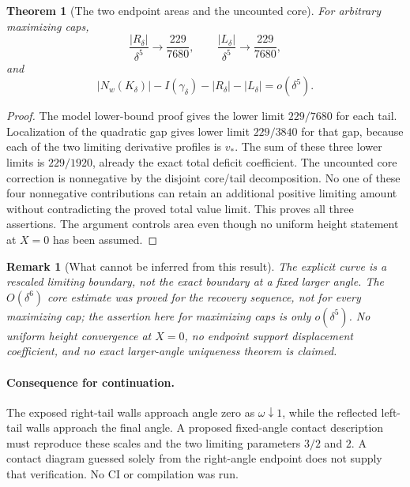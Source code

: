 \documentclass[11pt]{article}
\newtheorem{theorem}{Theorem}
\newtheorem{remark}{Remark}
\begin{document}
\begin{theorem}[The two endpoint areas and the uncounted core]
For arbitrary maximizing caps,
\[
 \frac{|R_\delta|}{\delta^5}\longrightarrow\frac{229}{7680},\qquad
 \frac{|L_\delta|}{\delta^5}\longrightarrow\frac{229}{7680},
\]
and
\[
 |N_w(K_\delta)|-I(\gamma_\delta)-|R_\delta|-|L_\delta|=o(\delta^5).
\]
\end{theorem}
\begin{proof}
The model lower-bound proof gives the lower limit $229/7680$ for each tail. Localization of the quadratic gap gives lower limit $229/3840$ for that gap, because each of the two limiting derivative profiles is $v_*$. The sum of these three lower limits is $229/1920$, already the exact total deficit coefficient. The uncounted core correction is nonnegative by the disjoint core/tail decomposition. No one of these four nonnegative contributions can retain an additional positive limiting amount without contradicting the proved total value limit. This proves all three assertions. The argument controls area even though no uniform height statement at $X=0$ has been assumed.
\end{proof}

\begin{remark}[What cannot be inferred from this result]
The explicit curve is a rescaled limiting boundary, not the exact boundary at a fixed larger angle. The $O(\delta^6)$ core estimate was proved for the recovery sequence, not for every maximizing cap; the assertion here for maximizing caps is only $o(\delta^5)$. No uniform height convergence at $X=0$, no endpoint support displacement coefficient, and no exact larger-angle uniqueness theorem is claimed.
\end{remark}

\paragraph{Consequence for continuation.}
The exposed right-tail walls approach angle zero as $\omega\downarrow1$, while the reflected left-tail walls approach the final angle. A proposed fixed-angle contact description must reproduce these scales and the two limiting parameters $3/2$ and $2$. A contact diagram guessed solely from the right-angle endpoint does not supply that verification. No CI or compilation was run.
\end{document}
